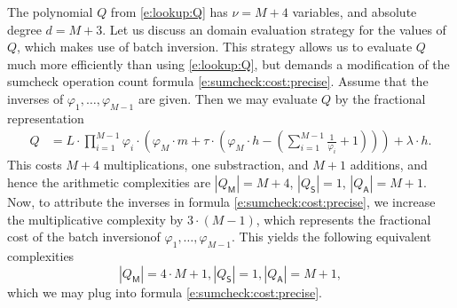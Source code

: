 \documentclass[11pt]{article}
\theoremstyle{definition}
\theoremstyle{remark}
\begin{document}
The polynomial $Q$ from \eqref{e:lookup:Q} has $\nu= M + 4$ variables, and absolute degree $d = M + 3$.
Let us discuss an domain evaluation strategy for the values of $Q$, which makes use of batch inversion. 
This strategy allows us to evaluate $Q$ much more efficiently than using \eqref{e:lookup:Q}, but demands a modification of the sumcheck operation count formula \eqref{e:sumcheck:cost:precise}.
Assume that the inverses of $\varphi_1, \ldots, \varphi_{M-1}$ are given.
Then we may evaluate $Q$ by the fractional representation
\begin{align*}
Q &= L\cdot  \prod_{i=1}^{M-1}\varphi_i\cdot \left(\varphi_M\cdot m + \tau\cdot \left(\varphi_M\cdot h - \left(\sum_{i=1}^{M-1} \frac{1}{\varphi_i} +1 \right)\right) \right) + \lambda\cdot h.
\end{align*}
This costs  $M + 4$ multiplications, one substraction, and $M+1$ additions, and hence
the arithmetic complexities are $|Q_\mathsf M| =  M +  4$, $|Q_\mathsf S| = 1$, $|Q_\mathsf A| = M + 1$.
Now, to attribute the inverses in formula \eqref{e:sumcheck:cost:precise}, we increase the multiplicative complexity by $3\cdot (M - 1)$, which represents the fractional cost of the batch inversion\footnotemark of $\varphi_1, \ldots, \varphi_{M-1}$. 
%
This yields the following equivalent complexities
 \[
|Q_\mathsf M| = 4\cdot M + 1 , |Q_\mathsf S| = 1, |Q_\mathsf A| = M + 1,
\]
which we may plug into formula \eqref{e:sumcheck:cost:precise}.
\end{document}
